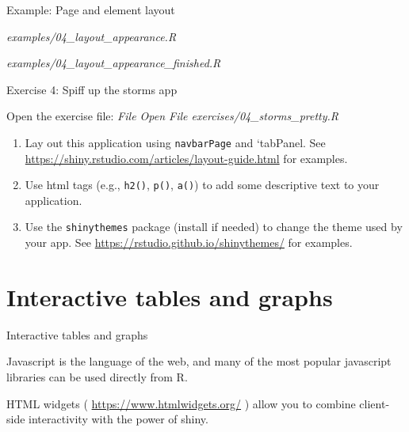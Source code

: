\documentclass[
  12pt,
  ignorenonframetext,
]{beamer}
\providecommand{\tightlist}{%
  \setlength{\itemsep}{0pt}\setlength{\parskip}{0pt}}
\begin{document}
\begin{frame}{Example: Page and element layout}
\protect\hypertarget{example-page-and-element-layout}{}

\begin{description}
\tightlist
\item[Start]
\emph{examples/04\_layout\_appearance.R}
\item[Finished]
\emph{examples/04\_layout\_appearance\_finished.R}
\end{description}

\end{frame}

\begin{frame}[fragile]{Exercise 4: Spiff up the storms app}
\protect\hypertarget{exercise-4-spiff-up-the-storms-app}{}

Open the exercise file: \emph{File \rightarrow Open File
\rightarrow exercises/04\_storms\_pretty.R}

\begin{enumerate}
\item
  Lay out this application using \texttt{navbarPage} and `tabPanel. See
  \url{https://shiny.rstudio.com/articles/layout-guide.html} for
  examples.
\item
  Use html tags (e.g., \texttt{h2()}, \texttt{p()}, \texttt{a()}) to add
  some descriptive text to your application.
\item
  Use the \texttt{shinythemes} package (install if needed) to change the
  theme used by your app. See
  \url{https://rstudio.github.io/shinythemes/} for examples.
\end{enumerate}

\end{frame}

\hypertarget{interactive-tables-and-graphs}{%
\section{Interactive tables and
graphs}\label{interactive-tables-and-graphs}}

\begin{frame}{Interactive tables and graphs}

Javascript is the language of the web, and many of the most popular
javascript libraries can be used directly from R.

HTML widgets ( \url{https://www.htmlwidgets.org/} ) allow you to combine
client-side interactivity with the power of shiny.

\end{frame}
\end{document}

